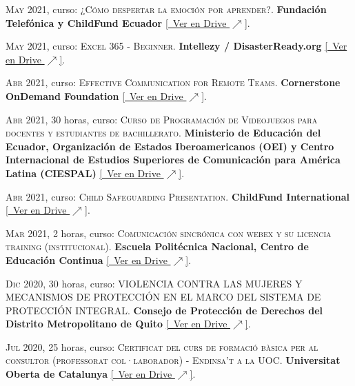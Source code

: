 \documentclass[a4paper]{article}
\begin{document}
\textsc{May} 2021, curso: \textsc{¿Cómo despertar la emoción por aprender?}.
\textbf{Fundación Telefónica y ChildFund Ecuador} \small \href{https://drive.google.com/file/d/1ShusFs0vlg2VxthVG9KCzus7t1EkHwUm/view}{[\faGoogleDrive~Ver en Drive $\nearrow$]}.

\textsc{May} 2021, curso: \textsc{Excel 365 - Beginner}.
\textbf{Intellezy / DisasterReady.org} \small \href{https://drive.google.com/file/d/1JgZSTssDVUwbuhvGW_cRfdHd--fbQ76p/view}{[\faGoogleDrive~Ver en Drive $\nearrow$]}.

\textsc{Abr} 2021, curso: \textsc{Effective Communication for Remote Teams}.
\textbf{Cornerstone OnDemand Foundation} \small \href{https://drive.google.com/file/d/1jsXaDeADF_PNcnGCqru9iTnpetYqxXZR/view}{[\faGoogleDrive~Ver en Drive $\nearrow$]}.

\textsc{Abr} 2021, 30 horas, curso: \textsc{Curso de Programación de Videojuegos para docentes y estudiantes de bachillerato}.
\textbf{Ministerio de Educación del Ecuador, Organización de Estados Iberoamericanos (OEI) y Centro Internacional de Estudios Superiores de Comunicación para América Latina (CIESPAL)} \small \href{https://drive.google.com/file/d/1GfFzo8ennO1Hy2xxhYzwsOyBkKciCdaD/view}{[\faGoogleDrive~Ver en Drive $\nearrow$]}.

\textsc{Abr} 2021, curso: \textsc{Child Safeguarding Presentation}.
\textbf{ChildFund International} \small \href{https://drive.google.com/file/d/1DzzdkpjkKC_ll7pGFnp5Ef9u82OQ3DXf/view}{[\faGoogleDrive~Ver en Drive $\nearrow$]}.

\textsc{Mar} 2021, 2 horas, curso: \textsc{Comunicación sincrónica con webex y su licencia training (institucional)}.
\textbf{Escuela Politécnica Nacional, Centro de Educación Continua} \small \href{https://drive.google.com/file/d/1jRuTCYF2upI0PiudrD1rXU0bO5m3yPOk/view}{[\faGoogleDrive~Ver en Drive $\nearrow$]}.

\textsc{Dic} 2020, 30 horas, curso: \textsc{VIOLENCIA CONTRA LAS MUJERES Y MECANISMOS DE PROTECCIÓN EN EL MARCO DEL SISTEMA DE PROTECCIÓN INTEGRAL}.
\textbf{Consejo de Protección de Derechos del Distrito Metropolitano de Quito} \small \href{https://drive.google.com/file/d/1oa3MJLJd9BaB_ph7vox6cuCcTqT2TUEs/view}{[\faGoogleDrive~Ver en Drive $\nearrow$]}.

\textsc{Jul} 2020, 25 horas, curso: \textsc{Certificat del curs de formació bàsica per al consultor (professorat col·laborador) - Endinsa't a la UOC}.
\textbf{Universitat Oberta de Catalunya} \small \href{https://drive.google.com/file/d/1AYsMm4yr07JVjLXQT-fBEKX490zljCSv/view}{[\faGoogleDrive~Ver en Drive $\nearrow$]}.
\end{document}
